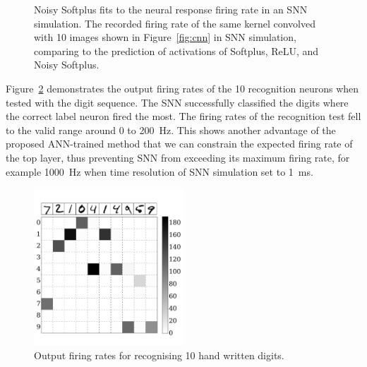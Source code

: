 \documentclass[runningheads,a4paper]{llncs}
\begin{document}
\begin{figure}[tbh!]
\begin{subfigure}[t]{0.6\textwidth}
	\end{subfigure}
	\caption{
		Noisy Softplus fits to the neural response firing rate in an SNN simulation.
		The recorded firing rate of the same kernel convolved with 10 images shown in Figure~\ref{fig:cnn} in SNN simulation, comparing to the prediction of activations of Softplus, ReLU, and Noisy Softplus.}
	\label{fig:af_compare}
\end{figure}

Figure~\ref{Fig:out} demonstrates the output firing rates of the 10 recognition neurons when tested with the digit sequence.
The SNN successfully classified the digits where the correct label neuron fired the most.
The firing rates of the recognition test fell to the valid range around 0 to 200~Hz.
This shows another advantage of the proposed ANN-trained method that we can constrain the expected firing rate of the top layer, thus preventing SNN from exceeding its maximum firing rate, for example 1000~Hz when time resolution of SNN simulation set to 1~ms.

\begin{figure}[tbp!]
	\centering
	\includegraphics[width=0.5\textwidth]{7.pdf}
	\caption{Output firing rates for recognising 10 hand written digits.}
	\label{Fig:out}
\end{figure}
\end{document}
